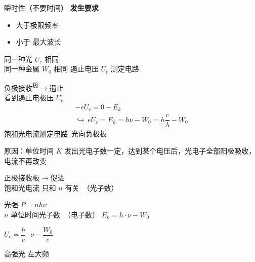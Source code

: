 \noindent 瞬时性（不要时间） %
\noindent \textbf{发生要求}
\begin{itemize}
\item 大于极限频率
\item 小于 最大波长
\end{itemize}

\noindent 同一种光 $U_c$ 相同\\
同一种金属 $W_0$ 相同
\noindent {} 遏止电压 $U_c$ 测定电路

\noindent 负极接收\textsuperscript{极}$\to$遏止\\ %
看到遏止电极压 $U_c$ %
\[
\begin{array}{l}
-eU_c=0-E_k\\
\hookrightarrow\ eU_c=E_k=h\nu-W_0=h\dfrac{c}{\lambda}-W_0
\end{array}
\]
\noindent {} \underline{饱和光电流测定电路}\ 光向负极板

\noindent 原因：单位时间 $K$ 发出光电子数一定，达到某个电压后，光电子全部阳极吸收，电流不再改变 %

\noindent 正极接收板$\to$促进\\
饱和光电流 只和 $n$ 有关\ （光子数）

\noindent 光强 $P=nh\nu$\\
$n$ 单位时间光子数\ （电子数）
\noindent $E_k=h\cdot\nu-W_0$ %

\noindent $U_c=\dfrac{h}{e}\cdot\nu-\dfrac{W_0}{e}$ %

\noindent 高强光 左大频 %
